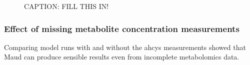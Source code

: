 \documentclass[journal=asbcd6,manuscript=article,layout=traditional]{achemso}
\begin{document}
\begin{figure}

\begin{minipage}[t]{\linewidth}

{\centering 


}

\end{minipage}%

\caption{\label{fig-laplace}CAPTION: FILL THIS IN!}

\end{figure}

\hypertarget{effect-of-missing-metabolite-concentration-measurements}{%
\subsubsection{Effect of missing metabolite concentration
measurements}\label{effect-of-missing-metabolite-concentration-measurements}}

Comparing model runs with and without the ahcys measurements showed that
Maud can produce sensible results even from incomplete metabolomics
data.
\end{document}

